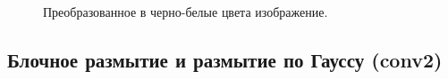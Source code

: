 \documentclass[a5paper, 10pt]{article}
\theoremstyle{definition}
\theoremstyle{plain}
\theoremstyle{remark}
\begin{document}
\begin{figure}[h!]
\caption{Преобразованное в черно-белые цвета изображение. }
\end{figure}

\newpage
\subsection{Блочное размытие и размытие по Гауссу (conv2)}
\end{document}
